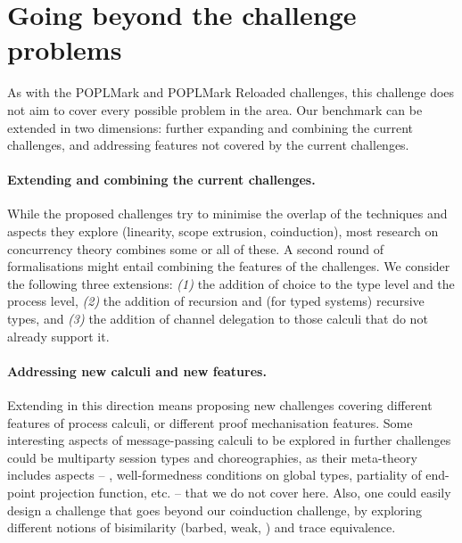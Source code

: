 \documentclass[runningheads]{llncs}
\begin{document}
\section{Going beyond the challenge problems}\label{sec:going-beyond}

As with the POPLMark and POPLMark Reloaded challenges, this challenge does not aim to cover every possible
problem in the area. Our benchmark can be extended in two
dimensions: further expanding and combining the current challenges,
and addressing features not covered by the current challenges.

\vspace{-1mm}%
\paragraph{Extending and combining the current challenges.}
While the proposed challenges try to minimise the overlap of the techniques
and aspects they explore (linearity, scope extrusion, coinduction), most
research on concurrency theory combines some or all of these. A second round of formalisations might
entail combining the features of the challenges.
We consider the following three extensions:
\emph{(1)} the addition of choice to the type level and the process level,
\emph{(2)} the addition of recursion and (for typed systems) recursive types,
and \emph{(3)} the
addition of channel delegation to those calculi that do not already
support it.%
%


\vspace{-1mm}%
\paragraph{Addressing new calculi and new features.}
Extending in this direction
means proposing new challenges covering different features of
process calculi, or different proof mechanisation features.
Some interesting aspects of message-passing calculi to be explored in
further challenges could be multiparty session types and
choreographies, as their meta-theory includes aspects -- \eg, well-formedness conditions on global types, partiality of end-point projection function, etc. --
that we do not cover here. Also, one could easily
design a challenge that goes beyond our coinduction challenge, by
exploring different notions of bisimilarity (barbed, weak, \etc)
and trace equivalence.
\end{document}
